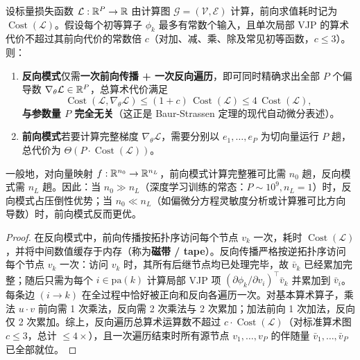 \begin{thmBox}
\begin{theorem}
\label{thm:cheap-gradient}
设标量损失函数 $\mathcal{L}: \mathbb{R}^P \to \mathbb{R}$ 由计算图 $\mathcal{G} = (\mathcal{V}, \mathcal{E})$ 计算，前向求值耗时记为 $\operatorname{Cost}(\mathcal{L})$。假设每个初等算子 $\phi_k$ 最多有常数个输入，且单次局部 VJP 的算术代价不超过其前向代价的常数倍 $c$（对加、减、乘、除及常见初等函数，$c \le 3$）。则：
\begin{enumerate}
  \item \textbf{反向模式}仅需\textbf{一次前向传播 + 一次反向遍历}，即可同时精确求出全部 $P$ 个偏导数 $\nabla_\theta \mathcal{L} \in \mathbb{R}^P$，总算术代价满足
  \[
    \operatorname{Cost}\!\left(\mathcal{L}, \nabla_\theta \mathcal{L}\right) \le (1 + c)\,\operatorname{Cost}(\mathcal{L}) \le 4\,\operatorname{Cost}(\mathcal{L}),
  \]
  \textbf{与参数量 $P$ 完全无关}（这正是 Baur-Strassen 定理的现代自动微分表述）。
  \item \textbf{前向模式}若要计算完整梯度 $\nabla_\theta \mathcal{L}$，需要分别以 $e_1, \dots, e_P$ 为切向量运行 $P$ 趟，总代价为 $\Theta(P \cdot \operatorname{Cost}(\mathcal{L}))$。
\end{enumerate}
一般地，对向量映射 $f: \mathbb{R}^{n_0} \to \mathbb{R}^{n_L}$，前向模式计算完整雅可比需 $n_0$ 趟，反向模式需 $n_L$ 趟。因此：当 $n_0 \gg n_L$（深度学习训练的常态：$P \sim 10^9, n_L = 1$）时，反向模式占压倒性优势；当 $n_0 \ll n_L$（如偏微分方程灵敏度分析或计算雅可比方向导数）时，前向模式反而更优。
\end{theorem}
\begin{proof}
在反向模式中，前向传播按拓扑序访问每个节点 $v_k$ 一次，耗时 $\operatorname{Cost}(\mathcal{L})$，并将中间数值缓存于内存（称为\textbf{磁带 / tape}）。反向传播严格按逆拓扑序访问每个节点 $v_k$ 一次：访问 $v_k$ 时，其所有后继节点均已处理完毕，故 $\bar{v}_k$ 已经累加完整；随后只需为每个 $i \in \mathrm{pa}(k)$ 计算局部 VJP 项 $(\partial \phi_k / \partial v_i)^\top \bar{v}_k$ 并累加到 $\bar{v}_i$。每条边 $(i \to k)$ 在全过程中恰好被正向和反向各遍历一次。对基本算术算子，乘法 $u \cdot v$ 前向需 1 次乘法，反向需 2 次乘法与 2 次累加；加法前向 1 次加法，反向仅 2 次累加。综上，反向遍历总算术运算数不超过 $c \cdot \operatorname{Cost}(\mathcal{L})$（对标准算术图 $c \le 3$，总计 $\le 4\times$），且一次遍历结束时所有源节点 $v_1, \dots, v_P$ 的伴随量 $\bar{v}_1, \dots, \bar{v}_P$ 已全部就位。
\end{proof}
\end{thmBox}


